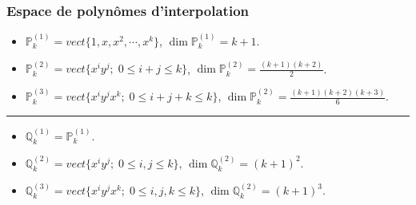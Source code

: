 \documentclass{beamer}
\begin{document}
\begin{frame}
\frametitle{Espace de polynômes d'interpolation}

\begin{itemize}
\item $\mathbb{P}_k^{(1)}=vect\{1,x,x^2,\cdots,x^k\}$, $\dim \mathbb{P}_k^{(1)}=k+1$.
\item $\mathbb{P}_k^{(2)}=vect\{x^iy^j;\; 0\leq i+j \leq k\}$, $\dim \mathbb{P}_k^{(2)}=\frac{(k+1)(k+2)}{2}$.
\item $\mathbb{P}_k^{(3)}=vect\{x^iy^jx^k;\; 0\leq i+j+k \leq k\}$, $\dim \mathbb{P}_k^{(2)}=\frac{(k+1)(k+2)(k+3)}{6}$.
\end{itemize}


\hrule


\begin{itemize}
\item $\mathbb{Q}_k^{(1)}=\mathbb{P}_k^{(1)}$.
\item $\mathbb{Q}_k^{(2)}=vect\{x^iy^j;\; 0\leq i,j \leq k\}$, $\dim \mathbb{Q}_k^{(2)}=(k+1)^2$.
\item $\mathbb{Q}_k^{(3)}=vect\{x^iy^jx^k;\; 0\leq i,j,k \leq k\}$, $\dim \mathbb{Q}_k^{(2)}=(k+1)^3$.
\end{itemize}
\end{frame}
\end{document}
